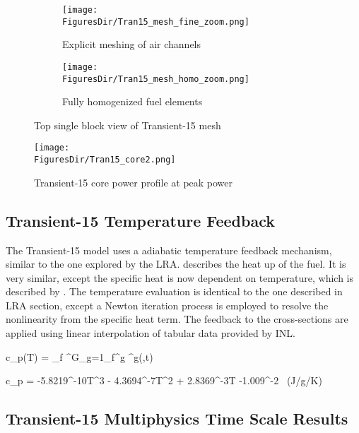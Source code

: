 \begin{figure}[!htbp]
\centering
\begin{subfigure}[!htbp]{0.49\textwidth}
\texttt{[image: \\FiguresDir/Tran15\_mesh\_fine\_zoom.png]}
\caption{Explicit meshing of air channels}
\label{fig:Tran15_mesh_fine_zoom}
\end{subfigure}
\begin{subfigure}[!htbp]{0.49\textwidth}
\texttt{[image: \\FiguresDir/Tran15\_mesh\_homo\_zoom.png]}
\caption{Fully homogenized fuel elements}
\label{fig:Tran15_mesh_homo_zoom}
\end{subfigure}
\caption{Top single block view of Transient-15 mesh}
\label{fig:Tran15_mesh_zoom}
\end{figure}

\begin{figure}[htbp!]
\centering
\texttt{[image: \\FiguresDir/Tran15\_core2.png]}
\caption{Transient-15 core power profile at peak power}
\label{fig:Tran15}
\end{figure}

\subsection{Transient-15 Temperature Feedback}

The Transient-15 model uses a adiabatic temperature feedback mechanism, similar to the one explored by the LRA.  describes the heat up of the fuel.  It is very similar, except the specific heat is now dependent on temperature, which is described by .  The temperature evaluation is identical to the one described in LRA section, except a Newton iteration process is employed to resolve the nonlinearity from the specific heat term.  The feedback to the cross-sections are applied using linear interpolation of tabular data provided by INL.

\be
\rho c_p(T)  = \kappa_f \sum^G_{g=1}\Sigma_f^g \phi^g(,t)
\label{eq:temp2}
\ee

\be
c_p = -5.8219^{-10}T^3 - 4.3694^{-7}T^2 + 2.8369^{-3}T -1.009^{-2} \ (J/g/K)
\label{eq:cp}
\ee

\subsection{Transient-15 Multiphysics Time Scale Results}

